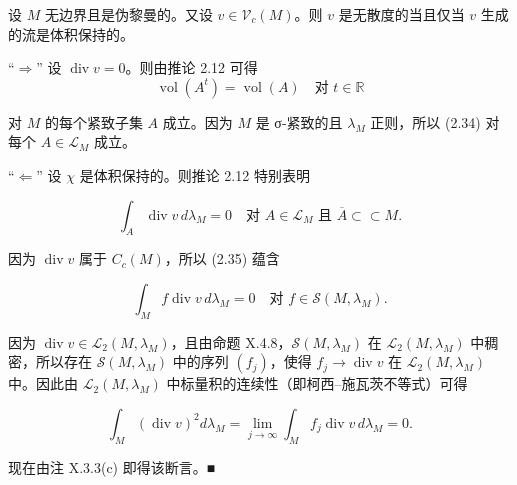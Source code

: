 \begin{proposition}

设 $ M $ 无边界且是伪黎曼的。又设 $ v \in \mathcal{V}_c(M) $。则 $ v $ 是无散度的当且仅当 $ v $ 生成的流是体积保持的。

\proofhead
“$ \Rightarrow $” 设 $ \operatorname{div} v = 0 $。则由推论 2.12 可得
\begin{equation}
\operatorname{vol}(A^t) = \operatorname{vol}(A) \quad \text{对 } t \in \mathbb{R}\tag{2.34}
\end{equation}

对 $ M $ 的每个紧致子集 $ A $ 成立。因为 $ M $ 是 σ-紧致的且 $ \lambda_M $ 正则，所以 (2.34) 对每个 $ A \in \mathcal{L}_M $ 成立。

“$ \Leftarrow $” 设 $ \chi $ 是体积保持的。则推论 2.12 特别表明

\begin{equation}
\int_A \operatorname{div} v \, d\lambda_M = 0 \quad \text{对 } A \in \mathcal{L}_M \text{ 且 } \overline{A} \subset\subset M .\tag{2.35}
\end{equation}

因为 $ \operatorname{div} v $ 属于 $ C_c(M) $，所以 (2.35) 蕴含

\begin{equation}
\int_M f \operatorname{div} v \, d\lambda_M = 0 \quad \text{对 } f \in \mathcal{S}(M,\lambda_M) .\tag{2.36}
\end{equation}

因为 $ \operatorname{div} v \in \mathcal{L}_2(M,\lambda_M) $，且由命题 X.4.8，$ \mathcal{S}(M,\lambda_M) $ 在 $ \mathcal{L}_2(M,\lambda_M) $ 中稠密，所以存在 $ \mathcal{S}(M,\lambda_M) $ 中的序列 $ (f_j) $，使得 $ f_j \to \operatorname{div} v $ 在 $ \mathcal{L}_2(M,\lambda_M) $ 中。因此由 $ \mathcal{L}_2(M,\lambda_M) $ 中标量积的连续性（即柯西–施瓦茨不等式）可得

\[
\int_M (\operatorname{div} v)^2 d\lambda_M = \lim_{j\to\infty}\int_M f_j \operatorname{div} v \, d\lambda_M = 0 .
\]

现在由注 X.3.3(c) 即得该断言。\nobreak\hspace{0.35em}■

\end{proposition}

